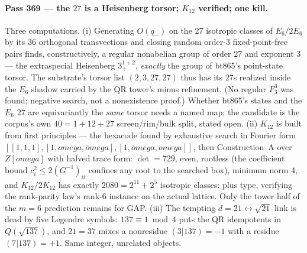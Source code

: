 \documentclass[12pt,a4paper]{article}
\def\mathbb#1{#1}%
\def\textbf#1{#1}%
\def\texttt#1{#1}%
\def\omega{omega}%
\def\cdot{ }%
\theoremstyle{definition}
\newcommand{\FF}{\mathbb{F}}
\newcommand{\QQ}{\mathbb{Q}}
\newcommand{\ZZ}{\mathbb{Z}}
\begin{document}
\paragraph{Pass 369 --- the $27$ is a Heisenberg torsor; $K_{12}$ verified; one
kill.}
Three computations.  (i) Generating $O(q_-)$ on the $27$ isotropic classes of
$E_6/2E_6$ by its $36$ orthogonal transvections and closing random order-$3$
fixed-point-free pairs finds, constructively, a \textbf{regular nonabelian
group of order $27$ and exponent $3$} --- the extraspecial Heisenberg
$3^{1+2}_+$, \emph{exactly} the group of \texttt{bt865}'s point-state torsor.
The substrate's torsor list $(2,3,27,27)$ thus has its $27$s realized inside
the $E_6$ shadow carried by the QR tower's minus refinement.  (No regular
$\FF_3^3$ was found; negative search, not a nonexistence proof.)  Whether
\texttt{bt865}'s states and the $E_6$ $27$ are equivariantly the \emph{same}
torsor needs a named map; the candidate is the corpus's own $40=1+12+27$
screen/rim/bulk split, stated open.  (ii) $K_{12}$ is built from first
principles --- the hexacode found by exhaustive search in Fourier form
$[[1,1,1],[1,\omega,\bar\omega],[1,\bar\omega,\omega]]$, then Construction~A
over $\ZZ[\omega]$ with halved trace form: $\det=729$, even, rootless (the
coefficient bound $c_i^2\le2(G^{-1})_{ii}$ confines any root to the searched
box), minimum norm $4$, and \textbf{$K_{12}/2K_{12}$ has exactly $2080=2^{11}+2^5$
isotropic classes: plus type}, verifying the rank-parity law's rank-$6$
instance on the actual lattice.  Only the tower half of the $m=6$ prediction
remains for GAP.  (iii) The tempting $d=21\leftrightarrow\sqrt{21}$ link is
dead by five Legendre symbols: $137\equiv1\bmod4$ puts the QR idempotents in
$\QQ(\sqrt{137})$, and $21=3\cdot7$ mixes a nonresidue $(3|137)=-1$ with a
residue $(7|137)=+1$.  Same integer, unrelated objects.
\end{document}

